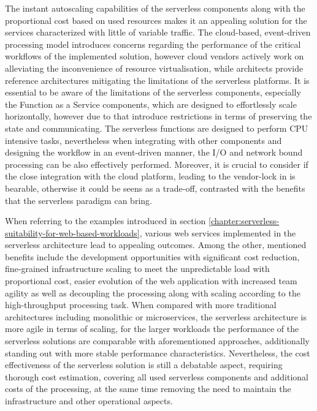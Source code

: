 The instant autoscaling capabilities of the serverless components along with the proportional cost based on used resources makes it an appealing solution for the services characterized with little of variable traffic.
The cloud-based, event-driven processing model introduces concerns regarding the performance of the critical workflows of the implemented solution, however cloud vendors actively work on alleviating the inconvenience of resource virtualisation, while architects provide reference architectures mitigating the limitations of the serverless platforms.
It is essential to be aware of the limitations of the serverless components, especially the Function as a Service components, which are designed to effortlessly scale horizontally, however due to that introduce restrictions in terms of preserving the state and communicating.
The serverless functions are designed to perform CPU intensive tasks, nevertheless when integrating with other components and designing the workflow in an event-driven manner, the I/O and network bound processing can be also effectively performed.
Moreover, it is crucial to consider if the close integration with the cloud platform, leading to the vendor-lock in is bearable, otherwise it could be seens as a trade-off, contrasted with the benefits that the serverless paradigm can bring.

When referring to the examples introduced in section \ref{chapter:serverless-suitability-for-web-based-workloads}, various web services implemented in the serverless architecture lead to appealing outcomes.
Among the other, mentioned benefits include the development opportunities with significant cost reduction, fine-grained infrastructure scaling to meet the unpredictable load with proportional cost, easier evolution of the web application with increased team agility as well as decoupling the processing along with scaling according to the high-throughput processing task.
When compared with more traditional architectures including monolithic or microservices, the serverless architecture is more agile in terms of scaling, for the larger workloads the performance of the serverless solutions are comparable with aforementioned approaches, additionally standing out with more stable performance characteristics.
Nevertheless, the cost effectiveness of the serverless solution is still a debatable aspect, requiring thorough cost estimation, covering all used serverless components and additional costs of the processing, at the same time removing the need to maintain the infrastructure and other operational aspects.

